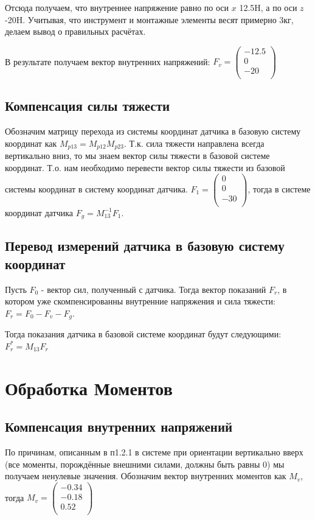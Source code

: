 \documentclass[a4paper,14pt,russian]{extreport} \usepackage{extsizes}
\begin{document}
	Отсюда получаем, что внутреннее напряжение равно по оси $x$ 12.5H, а по оси $z$ -20H. Учитывая, что инструмент и монтажные элементы весят примерно 3кг, делаем вывод о правильных расчётах.
	
	В результате получаем вектор внутренних напряжений: 
	$F_{v}=\begin{pmatrix}
	-12.5 \\ 0 \\ -20\\
	\end{pmatrix} $
	\subsection{Компенсация силы тяжести}
	Обозначим матрицу перехода из системы координат датчика в базовую систему координат как ${M_{p13}}={M_{p12}}{M_{p23}}$.
	Т.к. сила тяжести направлена всегда вертикально вниз, то мы знаем вектор силы тяжести в базовой системе координат. Т.о. нам необходимо перевести вектор силы тяжести из базовой системы координат в систему координат датчика. 
	$F_{1} = \begin{pmatrix}
				0 \\ 0 \\ -30\\
			 \end{pmatrix}$, тогда в системе координат датчика $F_{g}=M_{13}^{-1} F_{1}$.
	\subsection{Перевод измерений датчика в базовую систему координат}
	Пусть $F_{0}$ - вектор сил, полученный с датчика. Тогда вектор показаний $F_{r}$, в котором уже скомпенсированны внутренние напряжения и сила тяжести:
	$F_{r}=	F_{0}-F_{v}-F_{g}$.
	
	Тогда показания датчика в базовой системе координат будут следующими:
	$F_{r}^*=M_{13}F_{r}$
	\section{Обработка Моментов}
	\subsection{Компенсация внутренних напряжений}
	По причинам, описанным в п1.2.1 в системе при ориентации вертикально вверх (все моменты, порождённые внешними силами, должны быть равны 0)
	мы получаем ненулевые значения. 
	Обозначим вектор внутренних моментов как $M_{v}$, тогда 
	$M_{v}= \begin{pmatrix}
				-0.34 \\ -0.18 \\ 0.52\\
			\end{pmatrix}$
\end{document}
